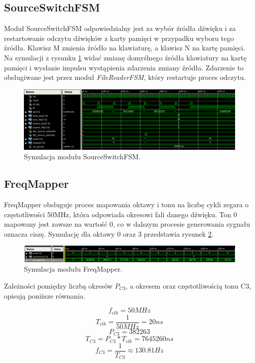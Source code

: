 \documentclass[12pt]{article}
\begin{document}
\subsection{SourceSwitchFSM}
Moduł SourceSwitchFSM odpowiedzialny jest za wybór źródła dźwięku i za restartowanie odczytu dźwięków z karty pamięci w przypadku wyboru tego źródła. Klawisz M zmienia źródło na klawiaturę, a klawisz N na kartę pamięci. Na symulacji z rysunku \ref{sim:source} widać zmianę domyślnego źródła klawiatury na kartę pamięci i wysłanie impulsu wystąpienia zdarzenia zmiany źródła. Zdarzenie to obsługiwane jest przez moduł \textit{FileReaderFSM}, który restartuje proces odczytu.
\begin{figure}[H]
  \centering
  \includegraphics[decodearray={1 0 1 0 1 0}, width=\linewidth]{images/source}
  \caption{Symulacja modułu SourceSwitchFSM.}
  \label{sim:source}
\end{figure}
\subsection{FreqMapper}
FreqMapper obsługuje proces mapowania oktawy i tonu na liczbę cykli zegara o częstotliwości 50MHz, która odpowiada okresowi fali danego dźwięku. Ton 0 mapowany jest zawsze na wartość 0, co w dalszym procesie generowania sygnału oznacza ciszę. Symulację dla oktawy 0 oraz 3 przedstawia rysunek \ref{sim:mapper}.
\begin{figure}[H]
  \centering
  \includegraphics[decodearray={1 0 1 0 1 0}, width=\linewidth]{images/mapper}
  \caption{Symulacja modułu FreqMapper.}
  \label{sim:mapper}
\end{figure}

Zależności pomiędzy liczbą okresów $P_{C3}$, a okresem oraz częstotliwością tonu C3, opisują poniższe równania.

\[ f_{clk} = 50MHz \]
\[ T_{clk} = \frac{1}{50MHz} = 20ns \]
\[ P_{C3} = 382263 \]
\[ T_{C3} = P_{C3} * T_{clk} = 7645260ns \]
\[ f_{C3} = \frac{1}{T_{C3}} \approx 130.81Hz \]
\end{document}
